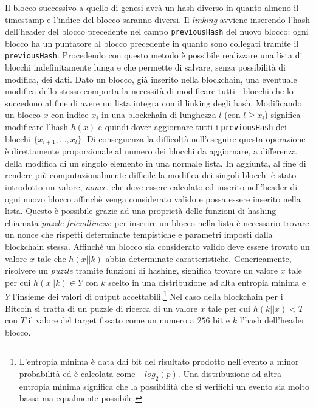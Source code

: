Il blocco successivo a quello di genesi avrà un hash diverso in quanto almeno il timestamp e l'indice del blocco saranno diversi. Il \textit{linking} avviene inserendo l'hash dell'header del blocco precedente nel campo \texttt{previousHash} del nuovo blocco: ogni blocco ha un puntatore al blocco precedente in quanto sono collegati tramite il \texttt{previousHash}.\newline
Procedendo con questo metodo è possibile realizzare una lista di blocchi indefinitamente lunga e che permette di salvare, senza possibilità di modifica, dei dati. Dato un blocco, già inserito nella blockchain, una eventuale modifica dello stesso comporta la necessità di modificare tutti i blocchi che lo succedono al fine di avere un lista integra con il linking degli hash.\newline
Modificando un blocco $x$ con indice $x_i$ in una blockchain di lunghezza $l$ (con $l\ge x_i$) significa modificare l'hash $h(x)$ e quindi dover aggiornare tutti i \texttt{previousHash} dei blocchi $\{x_{i+1},\dots,x_l\}$. Di conseguenza la difficoltà nell'eseguire questa operazione è direttamente proporzionale al numero dei blocchi da aggiornare, a differenza della modifica di un singolo elemento in una normale lista.\newline
In aggiunta, al fine di rendere più computazionalmente difficile la modifica dei singoli blocchi è stato introdotto un valore, \textit{nonce}, che deve essere calcolato ed inserito nell'header di ogni nuovo blocco affinchè venga considerato valido e possa essere inserito nella lista. Questo è possibile grazie ad una proprietà delle funzioni di hashing chiamata \textit{puzzle friendliness}: per inserire un blocco nella lista è necessario trovare un nonce che rispetti determinate tempistiche e parametri imposti dalla blockchain stessa. Affinchè un blocco sia considerato valido deve essere trovato un valore $x$ tale che $h(x||k)$ abbia determinate caratteristiche.\newline
Genericamente, risolvere un \textit{puzzle} tramite funzioni di hashing, significa trovare un valore $x$ tale per cui $h(x||k)\in Y$ con $k$ scelto in una distribuzione ad alta entropia minima e $Y$ l'insieme dei valori di output accettabili.\footnote{L'entropia minima è data dai bit del risultato prodotto nell'evento a minor probabilità ed è calcolata come $-log_2(p)$. Una distribuzione ad altra entropia minima significa che la possibilità che si verifichi un evento sia molto bassa ma equalmente possibile.}\newline
Nel caso della blockchain per i Bitcoin si tratta di un puzzle di ricerca di un valore $x$ tale per cui $h(k||x)<T$ con $T$ il valore del target fissato come un numero a $256$ bit e $k$ l'hash dell'header blocco.\newline
